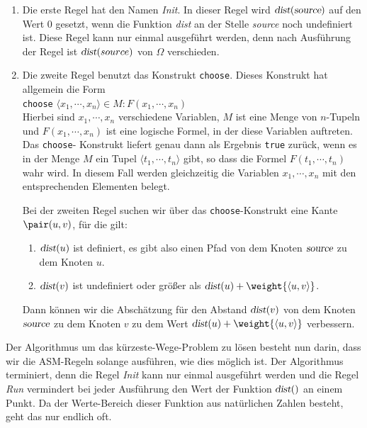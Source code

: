 \begin{enumerate}
\item Die erste Regel hat den Namen \textsl{Init}.
      In dieser Regel wird  $\textsl{dist}(\textsl{source})$ auf den Wert 0
      gesetzt, wenn die Funktion \textsl{dist} an der Stelle \textsl{source}
      noch undefiniert ist.  Diese Regel kann nur einmal ausgef\"uhrt werden,
      denn nach Ausf\"uhrung der Regel ist $\textsl{dist}(source)$ von $\Omega$ verschieden.
\item Die zweite Regel benutzt das Konstrukt \texttt{choose}.
      Dieses Konstrukt hat allgemein die Form 
      \\[0.2cm]
      \hspace*{1.3cm}
      \texttt{choose} $\langle x_1, \cdots, x_n\rangle \in M: F(x_1,\cdots,x_n)$
      \\[0.2cm]
      Hierbei sind $x_1, \cdots, x_n$ verschiedene Variablen, $M$ ist eine Menge von
      $n$-Tupeln und \linebreak 
      $F(x_1,\cdots,x_n)$ ist eine
      logische Formel, in der diese Variablen auftreten.
      Das \texttt{choose}-\linebreak
      Konstrukt liefert genau dann als Ergebnis \texttt{true}
      zur\"uck, wenn es in der Menge $M$ ein Tupel $\langle t_1,\cdots,t_n\rangle$ gibt, so dass die Formel 
      $F(t_1,\cdots,t_n)$ wahr wird.  In diesem Fall werden gleichzeitig die Variablen
      $x_1,\cdots,x_n$ mit den entsprechenden Elementen belegt.
      
      Bei der zweiten Regel suchen wir \"uber das \texttt{choose}-Konstrukt
      eine Kante $\pair(u,v)$, f\"ur die gilt: 
      \begin{enumerate}
      \item $\textsl{dist}(u)$ ist definiert, es gibt also einen Pfad von
            dem Knoten $\textsl{source}$  zu dem Knoten $u$.
      \item $\textsl{dist}(v)$ ist undefiniert oder gr\"o{\ss}er als 
            $\textsl{dist}(u)+\weight{\langle{}u,v\rangle}$. 
      \end{enumerate}
      Dann k\"onnen wir die Absch\"atzung
      f\"ur den Abstand $\textsl{dist}(v)$ von dem Knoten $\textsl{source}$ zu dem Knoten
      $v$ zu dem Wert $\textsl{dist}(u)+\weight{\langle{}u,v\rangle}$ verbessern.
\end{enumerate}
Der Algorithmus um das k\"urzeste-Wege-Problem zu l\"osen besteht nun darin,
dass wir die ASM-Regeln solange ausf\"uhren, wie dies m\"oglich ist. 
Der Algorithmus terminiert, denn die Regel \textsl{Init} kann nur einmal ausgef\"uhrt
werden und die Regel \textsl{Run} vermindert bei jeder Ausf\"uhrung den Wert
der Funktion $\textsl{dist}()$ an einem Punkt.  Da der Werte-Bereich dieser Funktion aus
nat\"urlichen Zahlen besteht, geht das nur endlich oft.


